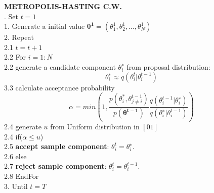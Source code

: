 {\bf METROPOLIS-HASTING C.W. }\\[.4cm]
{. \hspace*{0.2cm} Set $t=1$  \\
1. \hspace*{0.2cm} Generate a initial value $\mathbf{\theta^1}=(\theta_1^1, \theta_2^1 , . . . ,\theta_N^1 )$\\
2. \hspace*{0.2cm}  Repeat\\
2.1 \hspace*{0.3cm} $t=t+1$\\
2.2 \hspace*{0.3cm}  For $i=1:N$\\
2.2 \hspace*{0.4cm} generate a candidate component $\theta_i^∗$ from proposal distribution:
$$
\theta_i^∗ \approx q( \theta_i^t |\theta_i^{t-1} )
$$
3.3 \hspace*{0.4cm} calculate acceptance probability \\
$$
\alpha = min(1, \frac{p(\theta_i^*,\theta_{j \neq i}^{t-1})}{p(\mathbf{\theta^{t-1}})} \frac{q( \theta_i^{t-1}| \theta_i^{∗} ) } { q( \theta_i^{∗}| \theta_i^{t-1} )} )
$$
2.4 \hspace*{0.4cm} generate $u$ from Uniform distribution in $[0 1]$\\
2.4 \hspace*{0.4cm} if($\alpha  \leq u$)\\
2.5 \hspace*{0.5cm}  \textbf{accept sample component}: $\theta_i^t=\theta_i^∗$.\\
2.6 \hspace*{0.4cm} else\\
2.7 \hspace*{0.5cm}  \textbf{reject sample component}: $\theta_i^t=\theta_i^{t-1}$.\\
2.8 \hspace*{0.3cm}  EndFor \\
3.\hspace*{0.2cm} Until $t = T$\\
}\\[.4cm]
\\
\\
